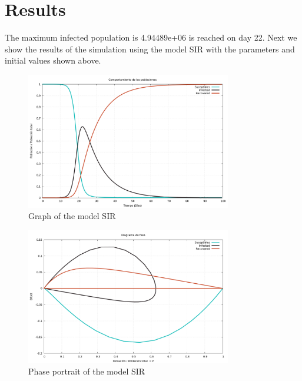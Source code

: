 \documentclass{article}
\begin{document}
\section*{Results}
The maximum infected population is 4.94489e+06 is reached on day 22.
Next we show the results of the simulation using the model SIR with the parameters and initial values shown above.
\begin{figure}[H]
\centering
\includegraphics[width=0.8\textwidth]{./data/Proyecto2/graph-SIR.png}
\caption{Graph of the model SIR}
\end{figure}
\begin{figure}[H]
\centering
\includegraphics[width=0.8\textwidth]{./data/Proyecto2/phase-SIR.png}
\caption{Phase portrait of the model SIR}
\end{figure}
\end{document}
